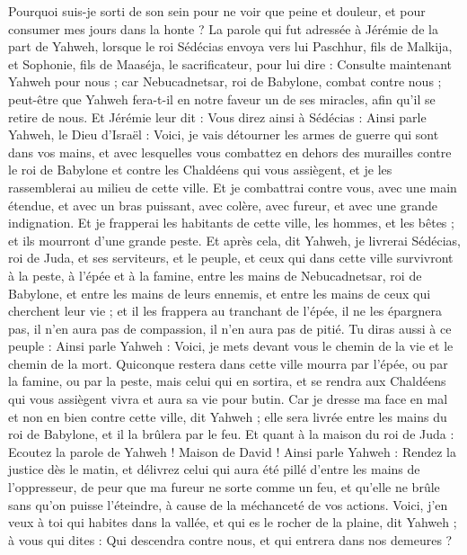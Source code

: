 \begin{multicols}{2}
Pourquoi suis-je sorti de son sein pour ne voir que peine et douleur, et pour consumer mes jours dans la honte ?
\VerseOne{}La parole qui fut adressée à Jérémie de la part de Yahweh, lorsque le roi Sédécias envoya vers lui Paschhur, fils de Malkija, et Sophonie, fils de Maaséja, le sacrificateur, pour lui dire :
Consulte maintenant Yahweh pour nous ; car Nebucadnetsar, roi de Babylone, combat contre nous ; peut-être que Yahweh fera-t-il en notre faveur un de ses miracles, afin qu'il se retire de nous.
Et Jérémie leur dit : Vous direz ainsi à Sédécias :
Ainsi parle Yahweh, le Dieu d'Israël : Voici, je vais détourner les armes de guerre qui sont dans vos mains, et avec lesquelles vous combattez en dehors des murailles contre le roi de Babylone et contre les Chaldéens qui vous assiègent, et je les rassemblerai au milieu de cette ville.
Et je combattrai contre vous, avec une main étendue, et avec un bras puissant, avec colère, avec fureur, et avec une grande indignation.
Et je frapperai les habitants de cette ville, les hommes, et les bêtes ; et ils mourront d'une grande peste.
Et après cela, dit Yahweh, je livrerai Sédécias, roi de Juda, et ses serviteurs, et le peuple, et ceux qui dans cette ville survivront à la peste, à l'épée et à la famine, entre les mains de Nebucadnetsar, roi de Babylone, et entre les mains de leurs ennemis, et entre les mains de ceux qui cherchent leur vie ; et il les frappera au tranchant de l'épée, il ne les épargnera pas, il n'en aura pas de compassion, il n'en aura pas de pitié.
Tu diras aussi à ce peuple : Ainsi parle Yahweh : Voici, je mets devant vous le chemin de la vie et le chemin de la mort.
Quiconque restera dans cette ville mourra par l'épée, ou par la famine, ou par la peste, mais celui qui en sortira, et se rendra aux Chaldéens qui vous assiègent vivra et aura sa vie pour butin.
Car je dresse ma face en mal et non en bien contre cette ville, dit Yahweh ; elle sera livrée entre les mains du roi de Babylone, et il la brûlera par le feu.
Et quant à la maison du roi de Juda : Ecoutez la parole de Yahweh !
Maison de David ! Ainsi parle Yahweh : Rendez la justice dès le matin, et délivrez celui qui aura été pillé d'entre les mains de l'oppresseur, de peur que ma fureur ne sorte comme un feu, et qu'elle ne brûle sans qu'on puisse l'éteindre, à cause de la méchanceté de vos actions.
Voici, j'en veux à toi qui habites dans la vallée, et qui es le rocher de la plaine, dit Yahweh ; à vous qui dites : Qui descendra contre nous, et qui entrera dans nos demeures ?

\end{multicols}
